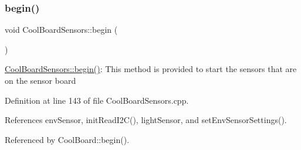 \subsubsection{\texorpdfstring{begin()}{begin()}}
{\footnotesize\ttfamily void Cool\+Board\+Sensors\+::begin (\begin{DoxyParamCaption}{ }\end{DoxyParamCaption})}

\hyperlink{classCoolBoardSensors_a97095823ef7c8f5290812f1405b966b3}{Cool\+Board\+Sensors\+::begin()}\+: This method is provided to start the sensors that are on the sensor board 

Definition at line 143 of file Cool\+Board\+Sensors.\+cpp.



References env\+Sensor, init\+Read\+I2\+C(), light\+Sensor, and set\+Env\+Sensor\+Settings().



Referenced by Cool\+Board\+::begin().


